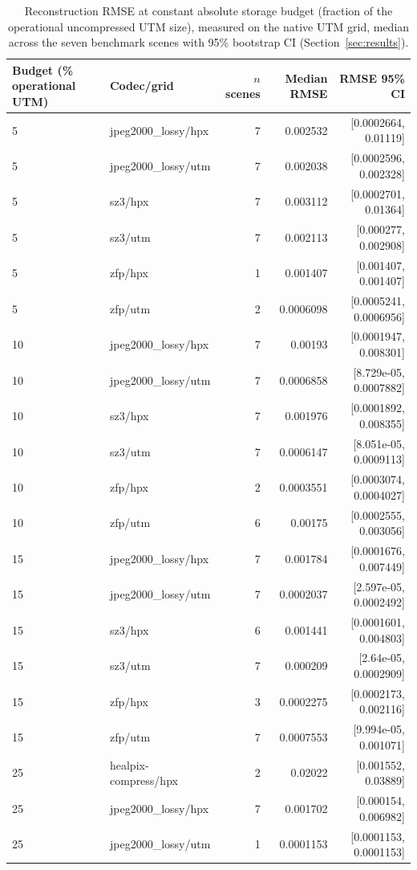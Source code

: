 \begin{table}[t]
\centering
\caption{Reconstruction RMSE at constant absolute storage budget (fraction of the operational uncompressed UTM size), measured on the native UTM grid, median across the seven benchmark scenes with 95\% bootstrap CI (Section~\ref{sec:results}).}
\label{tab:rmse_at_constant_size}
\begin{tabular}{@{}llrrr@{}}
\toprule
Budget (\% operational UTM) & Codec/grid & $n$ scenes & Median RMSE & RMSE 95\% CI \\
\midrule
5 & jpeg2000_lossy/hpx & 7 & 0.002532 & [0.0002664, 0.01119] \\
5 & jpeg2000_lossy/utm & 7 & 0.002038 & [0.0002596, 0.002328] \\
5 & sz3/hpx & 7 & 0.003112 & [0.0002701, 0.01364] \\
5 & sz3/utm & 7 & 0.002113 & [0.000277, 0.002908] \\
5 & zfp/hpx & 1 & 0.001407 & [0.001407, 0.001407] \\
5 & zfp/utm & 2 & 0.0006098 & [0.0005241, 0.0006956] \\
10 & jpeg2000_lossy/hpx & 7 & 0.00193 & [0.0001947, 0.008301] \\
10 & jpeg2000_lossy/utm & 7 & 0.0006858 & [8.729e-05, 0.0007882] \\
10 & sz3/hpx & 7 & 0.001976 & [0.0001892, 0.008355] \\
10 & sz3/utm & 7 & 0.0006147 & [8.051e-05, 0.0009113] \\
10 & zfp/hpx & 2 & 0.0003551 & [0.0003074, 0.0004027] \\
10 & zfp/utm & 6 & 0.00175 & [0.0002555, 0.003056] \\
15 & jpeg2000_lossy/hpx & 7 & 0.001784 & [0.0001676, 0.007449] \\
15 & jpeg2000_lossy/utm & 7 & 0.0002037 & [2.597e-05, 0.0002492] \\
15 & sz3/hpx & 6 & 0.001441 & [0.0001601, 0.004803] \\
15 & sz3/utm & 7 & 0.000209 & [2.64e-05, 0.0002909] \\
15 & zfp/hpx & 3 & 0.0002275 & [0.0002173, 0.002116] \\
15 & zfp/utm & 7 & 0.0007553 & [9.994e-05, 0.001071] \\
25 & healpix-compress/hpx & 2 & 0.02022 & [0.001552, 0.03889] \\
25 & jpeg2000_lossy/hpx & 7 & 0.001702 & [0.000154, 0.006982] \\
25 & jpeg2000_lossy/utm & 1 & 0.0001153 & [0.0001153, 0.0001153] \\

\end{tabular}
\end{table}
